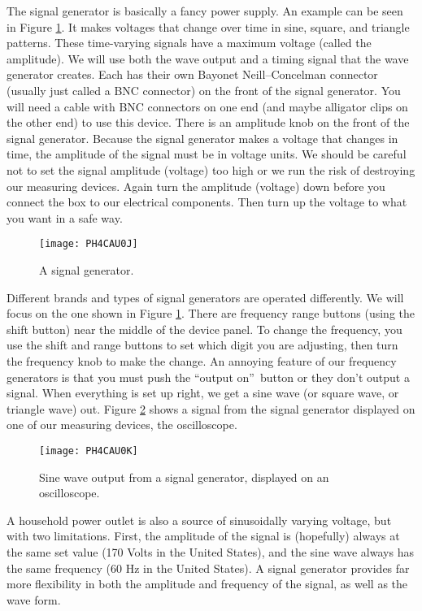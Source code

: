 The signal generator is basically a fancy
power supply. 
An example can be seen in Figure \ref{fig:signal_generator}.
It makes voltages that change over time in sine,
square, and triangle patterns. These time-varying signals have a maximum
voltage (called the amplitude). We will use both the wave output and a
timing signal that the wave generator creates. Each has their own Bayonet
Neill--Concelman connector (usually just called a BNC connector) on the
front of the signal generator. You will need a cable with BNC connectors on
one end (and maybe alligator clips on the other end) to use this device.
There is an amplitude knob on the front of the signal generator. Because the
signal generator makes a voltage that changes in time, the amplitude of the
signal must be in voltage units. We should be careful not to set the signal
amplitude (voltage) too high or we run the risk of destroying our measuring
devices. Again turn the amplitude (voltage) down before you connect the box
to our electrical components. Then turn up the voltage to what you want in a
safe way.
\begin{figure}[htbp!]
\centering
\texttt{[image: PH4CAU0J]}
\caption[A signal generator]{A signal generator.}
\label{fig:signal_generator}
\end{figure}

Different brands and types of signal generators are operated differently.
We will focus on the one shown in Figure \ref{fig:signal_generator}.
There are frequency range buttons (using the shift button) near the middle
of the device panel. To change the frequency, you use the shift and range
buttons to set which digit you are adjusting, then turn the frequency knob
to make the change. An annoying feature of our frequency generators is that
you must push the \textquotedblleft output on\textquotedblright\ button or
they don't output a signal. When everything is set up right, we get a sine
wave (or square wave, or triangle wave) out. 
Figure \ref{fig:signal_generator_output} shows a signal from the
signal generator displayed on one of our measuring devices, the
oscilloscope. 
\begin{figure}[htbp!]
\centering
\texttt{[image: PH4CAU0K]}
\caption[Sine wave output from a signal generator]{Sine wave output from
a signal generator, displayed on an oscilloscope.}
\label{fig:signal_generator_output}
\end{figure}

A household power outlet is also a source of sinusoidally varying voltage, but
with two limitations. First, the amplitude of the signal is (hopefully) always
at the same set value (170 Volts in the United States), and the sine wave
always has the same frequency (60 Hz in the United States). A signal generator 
provides far more flexibility in both the amplitude and frequency of the signal,
as well as the wave form.

